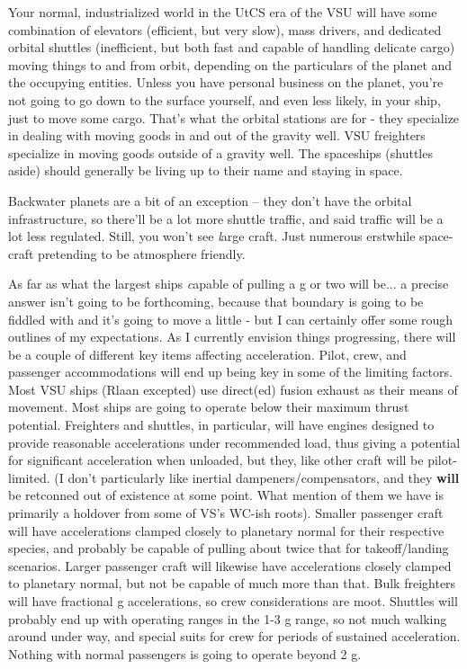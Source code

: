 Your normal, industrialized world in the UtCS era of the VSU will have
some combination of elevators (efficient, but very slow), mass
drivers, and dedicated orbital shuttles (inefficient, but both fast
and capable of handling delicate cargo) moving things to and from
orbit, depending on the particulars of the planet and the occupying
entities. Unless you have personal business on the planet, you're not
going to go down to the surface yourself, and even less likely, in
your ship, just to move some cargo. That's what the orbital stations
are for - they specialize in dealing with moving goods in and out of
the gravity well. VSU freighters specialize in moving goods outside of
a gravity well. The spaceships (shuttles aside) should generally be
living up to their name and staying in space.

Backwater planets are a bit of an exception -- they don't have the
orbital infrastructure, so there'll be a lot more shuttle traffic, and
said traffic will be a lot less regulated. Still, you won't see {\emph
large} craft. Just numerous erstwhile space-craft pretending to be
atmosphere friendly.

As far as what the largest ships {\emph capable} of pulling a g or two
will be... a precise answer isn't going to be forthcoming, because
that boundary is going to be fiddled with and it's going to move a
little - but I can certainly offer some rough outlines of my
expectations. As I currently envision things progressing, there will
be a couple of different key items affecting acceleration. Pilot,
crew, and passenger accommodations will end up being key in some of
the limiting factors. Most VSU ships (Rlaan excepted) use direct(ed)
fusion exhaust as their means of movement. Most ships are going to
operate below their maximum thrust potential. Freighters and shuttles,
in particular, will have engines designed to provide reasonable
accelerations under recommended load, thus giving a potential for
significant acceleration when unloaded, but they, like other craft
will be pilot-limited. (I don't particularly like inertial
dampeners/compensators, and they {\bf will} be retconned out of
existence at some point. What mention of them we have is primarily a
holdover from some of VS's WC-ish roots). Smaller passenger craft will
have accelerations clamped closely to planetary normal for their
respective species, and probably be capable of pulling about twice
that for takeoff/landing scenarios. Larger passenger craft will
likewise have accelerations closely clamped to planetary normal, but
not be capable of much more than that. Bulk freighters will have
fractional g accelerations, so crew considerations are moot. Shuttles
will probably end up with operating ranges in the 1-3 g range, so not
much walking around under way, and special suits for crew for periods
of sustained acceleration. Nothing with normal passengers is going to
operate beyond 2 g.

